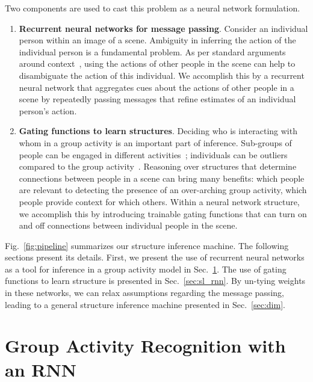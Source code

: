 \documentclass[10pt,twocolumn,letterpaper]{article}
\begin{document}
Two components are used to cast this problem as a neural network formulation.
\begin{enumerate}
\item {\bf Recurrent neural networks for message passing}.  Consider an individual person within an image of a scene.  Ambiguity in inferring the action of the individual person is a fundamental problem.  As per standard arguments around context~\cite{TorralbaMFR03,HoiemEH06,Choi_VSWS_2009,LanWYRM12}, using the actions of other people in the scene can help to disambiguate the action of this individual.  We accomplish this by a recurrent neural network that aggregates cues about the actions of other people in a scene by repeatedly passing messages that refine estimates of an individual person's action.

\item {\bf Gating functions to learn structures}. Deciding who is interacting with whom in a group activity is an important part of inference.  Sub-groups of people can be engaged in different activities~\cite{ChoiCPS14}; individuals can be outliers compared to the group activity~\cite{LanWYRM12}. Reasoning over structures that determine connections between people in a scene can bring many benefits: which people are relevant to detecting the presence of an over-arching group activity, which people provide context for which others. Within a neural network structure, we accomplish this by introducing trainable gating functions that can turn on and off connections between individual people in the scene.
\end{enumerate}

Fig.~\ref{fig:pipeline} summarizes our structure inference machine.
The following sections present its details.  First, we present the use of recurrent neural networks as a tool for inference in a group activity model in Sec.~\ref{sec:bp_rnn}.  The use of gating functions to learn structure is presented in Sec.~\ref{sec:sl_rnn}.  By un-tying weights in these networks, we can relax assumptions regarding the message passing, leading to a general structure inference machine presented in Sec.~\ref{sec:dim}. 


\vspace{-1mm}
\section{Group Activity Recognition with an RNN}
\label{sec:bp_rnn}
\vspace{-1mm}
\end{document}

